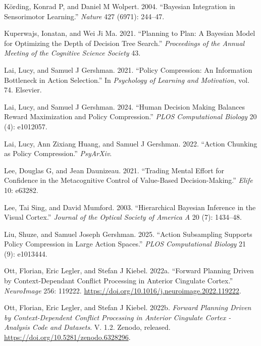 \documentclass[
  letterpaper,
  DIV=11,
  numbers=noendperiod]{scrartcl}
\newlength{\cslhangindent}
\newenvironment{CSLReferences}[2] %
 {\begin{list}{}{%
  \setlength{\itemindent}{0pt}
  \setlength{\leftmargin}{0pt}
  \setlength{\parsep}{0pt}
  \ifodd #1
   \setlength{\leftmargin}{\cslhangindent}
   \setlength{\itemindent}{-1\cslhangindent}
  \fi
  \setlength{\itemsep}{#2\baselineskip}}}
 {\end{list}}
\begin{document}
\begin{CSLReferences}{1}{1}
Körding, Konrad P, and Daniel M Wolpert. 2004. {``Bayesian Integration
in Sensorimotor Learning.''} \emph{Nature} 427 (6971): 244--47.

Kuperwajs, Ionatan, and Wei Ji Ma. 2021. {``Planning to Plan: A Bayesian
Model for Optimizing the Depth of Decision Tree Search.''}
\emph{Proceedings of the Annual Meeting of the Cognitive Science
Society} 43.

Lai, Lucy, and Samuel J Gershman. 2021. {``Policy Compression: An
Information Bottleneck in Action Selection.''} In \emph{Psychology of
Learning and Motivation}, vol. 74. Elsevier.

Lai, Lucy, and Samuel J Gershman. 2024. {``Human Decision Making
Balances Reward Maximization and Policy Compression.''} \emph{PLOS
Computational Biology} 20 (4): e1012057.

Lai, Lucy, Ann Zixiang Huang, and Samuel J Gershman. 2022. {``Action
Chunking as Policy Compression.''} \emph{PsyArXiv}.

Lee, Douglas G, and Jean Daunizeau. 2021. {``Trading Mental Effort for
Confidence in the Metacognitive Control of Value-Based
Decision-Making.''} \emph{Elife} 10: e63282.

Lee, Tai Sing, and David Mumford. 2003. {``Hierarchical Bayesian
Inference in the Visual Cortex.''} \emph{Journal of the Optical Society
of America A} 20 (7): 1434--48.

Liu, Shuze, and Samuel Joseph Gershman. 2025. {``Action Subsampling
Supports Policy Compression in Large Action Spaces.''} \emph{PLOS
Computational Biology} 21 (9): e1013444.

Ott, Florian, Eric Legler, and Stefan J Kiebel. 2022a. {``Forward
Planning Driven by Context-Dependant Conflict Processing in Anterior
Cingulate Cortex.''} \emph{NeuroImage} 256: 119222.
\url{https://doi.org/10.1016/j.neuroimage.2022.119222}.

Ott, Florian, Eric Legler, and Stefan J Kiebel. 2022b. \emph{Forward
Planning Driven by Context-Dependent Conflict Processing in Anterior
Cingulate Cortex - Analysis Code and Datasets}. V. 1.2. Zenodo,
released. \url{https://doi.org/10.5281/zenodo.6328296}.


\end{CSLReferences}
\end{document}
